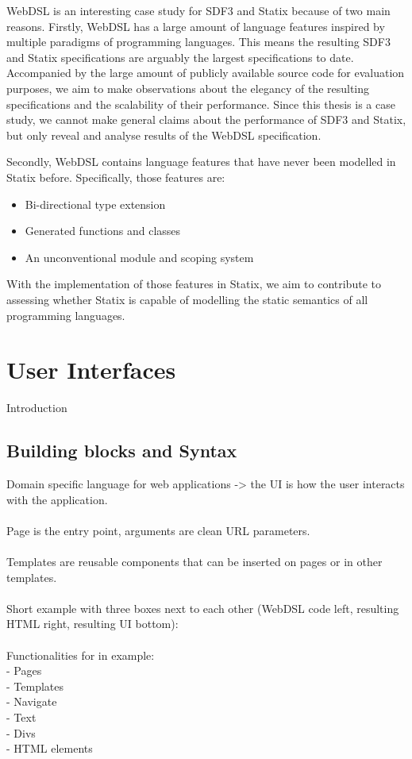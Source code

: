   WebDSL is an interesting case study for SDF3 and Statix because of two main reasons. Firstly, WebDSL has a large amount of language features inspired by multiple paradigms of programming languages. This means the resulting SDF3 and Statix specifications are arguably the largest specifications to date. Accompanied by the large amount of publicly available source code for evaluation purposes, we aim to make observations about the elegancy of the resulting specifications and the scalability of their performance. Since this thesis is a case study, we cannot make general claims about the performance of SDF3 and Statix, but only reveal and analyse results of the WebDSL specification.

  Secondly, WebDSL contains language features that have never been modelled in Statix before. Specifically, those features are:

  \begin{itemize}
    \item Bi-directional type extension
    \item Generated functions and classes
    \item An unconventional module and scoping system
  \end{itemize}

  With the implementation of those features in Statix, we aim to contribute to assessing whether Statix is capable of modelling the static semantics of all programming languages.

  \section{\label{sec:ui}User Interfaces}

    Introduction

    \subsection{\label{subsec:building-blocks}Building blocks and Syntax}

      Domain specific language for web applications -> the UI is how the user interacts with the application.
      \\\\Page is the entry point, arguments are clean URL parameters. \\\\Templates are reusable components that can be inserted on pages or in other templates.
      \\\\Short example with three boxes next to each other (WebDSL code left, resulting HTML right, resulting UI bottom):
      \\\\Functionalities for in example:
      \\- Pages
      \\- Templates
      \\- Navigate
      \\- Text
      \\- Divs
      \\- HTML elements

